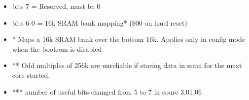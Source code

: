 \begin{itemize}
\item bits 7 = Reserved, must be 0
\item bits 6-0 = 16k SRAM bank mapping* (\$00 on hard reset)
\item[] * Maps a 16k SRAM bank over the bottom 16k. Applies only in
  config mode when the bootrom is disabled
\item[] ** Odd multiples of 256k are unreliable if storing data in sram
  for the mext core started.
\item[] *** number of useful bits changed from 5 to 7 in coure 3.01.06
\end{itemize}


